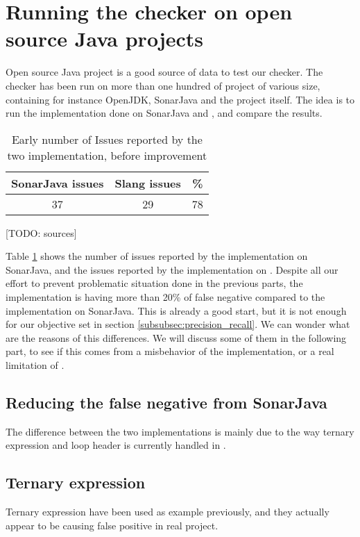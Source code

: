 \section{Running the checker on open source Java projects}
\label{sec:running_checker}

Open source Java project is a good source of data to test our checker. 
The checker has been run on more than one hundred of project of various size, containing for instance OpenJDK, SonarJava and the \slang project itself. 
The idea is to run the implementation done on SonarJava and \slang, and compare the results.

\begin{table}[h]
	\centering
	\caption{Early number of Issues reported by the two implementation, before improvement}
	\label{table:early-sonarjava-vs-slang}
	\begin{tabular}{|c|c|c|}
		\hline
		\bf SonarJava issues & \bf Slang issues & \bf \% \\ \hline
		37 &  29 &  78 \\ \hline
	\end{tabular}
\end{table}

[TODO: sources] \newline

Table \ref{table:early-sonarjava-vs-slang} shows the number of issues reported by the implementation on SonarJava, and the issues reported by the implementation on \slang. 
Despite all our effort to prevent problematic situation done in the previous parts,  the implementation is having more than 20\% of false negative compared to the implementation on SonarJava. This is already a good start, but it is not enough for our objective set in section \ref{subsubsec:precision_recall}.
We can wonder what are the reasons of this differences.
We will discuss some of them in the following part, to see if this comes from a misbehavior of the implementation, or a real limitation of \slang.

\subsection{Reducing the false negative from SonarJava}
\label{subsec:reducing_false_positive_sonarjava}

The difference between the two implementations is mainly due to the way ternary expression and loop header is currently handled in \slang.

\subsection{Ternary expression}
\label{subsec:reducing_false_positive_ternary}
Ternary expression have been used as example previously, and they actually appear to be causing false positive in real project.

